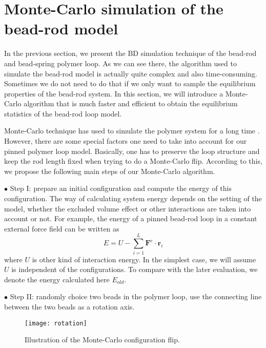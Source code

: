 \section{Monte-Carlo simulation of the bead-rod model}
\label{sec:monte_carlo_simulation_of_the_bead_rod_model}

In the previous section, we present the BD simulation technique of the bead-rod and bead-spring polymer loop. As we can see there, the algorithm used to simulate the bead-rod model is actually quite complex and also time-consuming. Sometimes we do not need to do that if we only want to sample the equilibrium properties of the bead-rod system. In this section, we will introduce a Monte-Carlo algorithm that is much faster and efficient to obtain the equilibrium statistics of the bead-rod loop model. 

Monte-Carlo technique has used to simulate the polymer system for a long time \cite{Binder1995}. However, there are some special factors one need to take into account for our pinned polymer loop model. Basically, one has to preserve the loop structure and keep the rod length fixed when trying to do a Monte-Carlo flip. According to this, we propose the following main steps of our Monte-Carlo algorithm. 

$\bullet$ Step I: prepare an initial configuration and compute the energy of this configuration. The way of calculating system energy depends on the setting of the model, whether the excluded volume effect or other interactions are taken into account or not. For example, the energy of a pinned bead-rod loop in a constant external force field can be written as
\begin{equation}
    \label{eq:mcEnergy}
    E = U - \sum_{i=1}^L\mathbf{F}^{e} \cdot \mathbf{r}_i
\end{equation}
where $U$ is other kind of interaction energy. In the simplest case, we will assume $U$ is independent of the configurations. To compare with the later evaluation, we denote the energy calculated here $E_{old}$.

$\bullet$ Step II: randomly choice two beads in the polymer loop, use the connecting line between the two beads as a rotation axis.
\begin{figure}[htpb]
    \centering
    \texttt{[image: rotation]}
    \caption{Illustration of the Monte-Carlo configuration flip. }
    \label{fig:rotation}
\end{figure}

